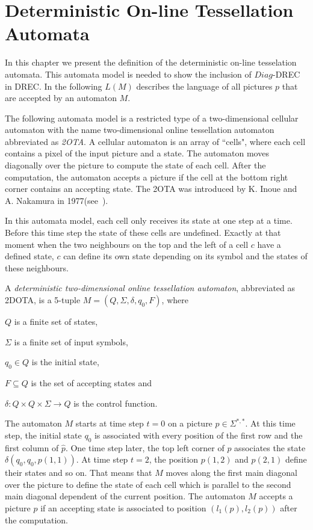 \section{Deterministic On-line Tessellation Automata}
In this chapter we present the definition of the deterministic on-line tesselation automata.
This automata model is needed to show the inclusion of $Diag$-DREC in DREC. In the following $L(M)$
describes the language of all pictures $p$ that are accepted by an automaton $M$.

The following automata model is a restricted type of a two-dimensional cellular automaton with the
name two-dimensional online tessellation automaton abbreviated as \emph{2OTA}. A cellular
automaton is an array of ``cells", where each cell contains a pixel of the input picture and a state. The automaton
moves diagonally over the picture to compute the state of each cell. After the computation, the
automaton accepts a picture if the cell at the bottom right corner contains an accepting state. The
2OTA was introduced by K. Inoue and A. Nakamura in
1977(see~\cite{inoue1977properties}).

In this automata model, each cell only receives its state at one step at a time. Before this time
step the state of these cells are undefined. Exactly at that moment when the two neighbours on the
top and the left of a cell $c$ have a defined state, $c$ can define its own state depending on its symbol and the states of these neighbours.
\begin{definition} A \emph{deterministic two-dimensional online tessellation automaton}, abbreviated
as 2DOTA, is a 5-tuple $M = (Q, \Sigma, \delta, q_0, F)$, where
\begin{compactitem}
    \item $Q$ is a finite set of states,
    \item $\Sigma$ is a finite set of input symbols,
    \item $q_0 \in Q$ is the initial state,
    \item $F \subseteq Q$ is the set of accepting states and
    \item $\delta: Q \times Q \times \Sigma \rightarrow Q$ is the control function.
\end{compactitem}
\end{definition} 
The automaton $M$ starts at time step $t = 0$ on a picture $p \in \Sigma^{*,*}$. At this time step,
the initial state $q_0$ is associated with every position of the first row and the first column of
$\hat{p}$.
One time step later, the top left corner of $p$ associates the state $\delta(q_0, q_0, p(1, 1))$. At
time step $t = 2$, the position $p(1, 2)$ and $p(2, 1)$ define their states and so on. That means
that $M$ moves along the first main diagonal over the picture to define the state of each cell which
is parallel to the second main diagonal dependent of the current position. The automaton $M$ accepts
a picture $p$ if an accepting state is associated to position $(l_1(p), l_2(p))$ after the
computation.

